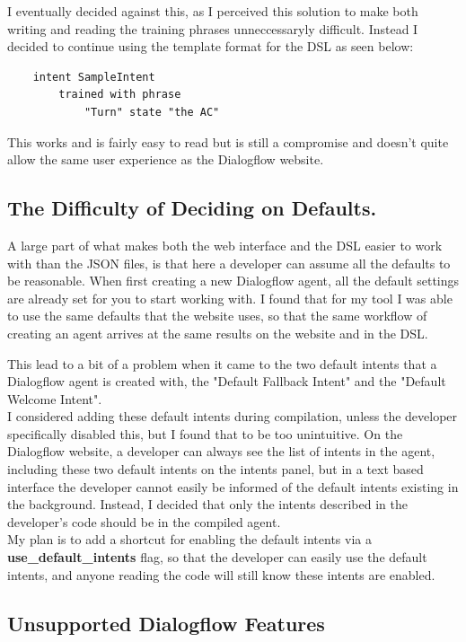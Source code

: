 I eventually decided against this, as I perceived this solution to make both writing and reading the training phrases unneccessaryly difficult. Instead I decided to continue using the template format for the DSL as seen below:

\begin{verbatim}
    intent SampleIntent
        trained with phrase
            "Turn" state "the AC"
\end{verbatim}

This works and is fairly easy to read but is still a compromise and doesn't quite allow the same user experience as the Dialogflow website.

\subsection{The Difficulty of Deciding on Defaults.}

A large part of what makes both the web interface and the DSL easier to work with than the JSON files, is that here a developer can assume all the defaults to be reasonable. When first creating a new Dialogflow agent, all the default settings are already set for you to start working with. I found that for my tool I was able to use the same defaults that the website uses, so that the same workflow of creating an agent arrives at the same results on the website and in the DSL.

This lead to a bit of a problem when it came to the two default intents that a Dialogflow agent is created with, the "Default Fallback Intent" and the "Default Welcome Intent". \\
I considered adding these default intents during compilation, unless the developer specifically disabled this, but I found that to be too unintuitive. On the Dialogflow website, a developer can always see the list of intents in the agent, including these two default intents on the intents panel, but in a text based interface the developer cannot easily be informed of the default intents existing in the background. Instead, I decided that only the intents described in the developer's code should be in the compiled agent. \\
My plan is to add a shortcut for enabling the default intents via a \textbf{use\_default\_intents} flag, so that the developer can easily use the default intents, and anyone reading the code will still know these intents are enabled.

\subsection{Unsupported Dialogflow Features}

